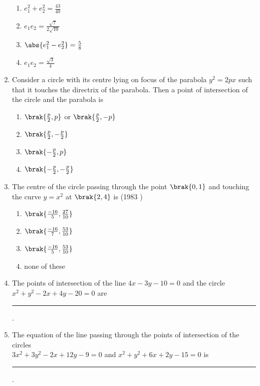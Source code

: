 \begin{enumerate}
		 \begin{multicols}{4}
\begin{enumerate}
			\item $e_1^2+e_2^2=\frac{43}{40}$
			\item $e_1e_2=\frac{\sqrt{7}}{2\sqrt{10}}$
			\item $\abs{ e_1^2-e_2^2}=\frac{5}{8}$
			\item $e_1e_2=\frac{\sqrt{3}}{4}$ 
		 \end{enumerate}
\end{multicols}
\item Consider a circle with its centre lying on focus of the parabola $y^2=2px$ such that it touches the directrix of the parabola. Then a point of intersection of the circle and the parabola is
        \hfill{}
\begin{multicols}{2}
\begin{enumerate}
    \item $\brak{\frac{p}{2},p}$ or $\brak{\frac{p}{2},-p}$
    \item $\brak{\frac{p}{2},-\frac{p}{2}}$
    \item $\brak{-\frac{p}{2},p}$
    \item $\brak{-\frac{p}{2},-\frac{p}{2}}$
\end{enumerate}
\end{multicols}
    \item The centre of the circle passing through the point $\brak{0,1}$ and touching the curve $y = x^{2}$ at $\brak{2, 4}$ is
    \hfill {(1983 )}
    	\begin{multicols}{4}
\begin{enumerate}
    		\item $\brak{\frac{-16}{5}, \frac{27}{10}}$
    		\item $\brak{\frac{-16}{7}, \frac{53}{10}}$
    		\item $\brak{\frac{-16}{5}, \frac{53}{10}}$
    		\item none of these
    	\end{enumerate}
    \end{multicols}
\item The points of intersection of the line $4x-3y-10=0$ and the circle $x^{2}+y^{2}-2x+4y-20=0$ are    \rule{1cm}{0.01pt}.
	\hfill{}
\item The equation of the line passing through the points of intersection of the circles\\ $3x^{2}+3y^{2}-2x+12y-9=0$ and $x^{2}+y^{2}+6x+2y-15=0$ is
\rule{1cm}{0.01pt}.

\end{enumerate}
